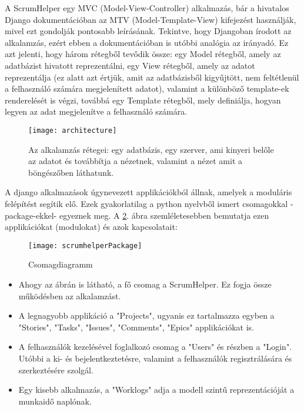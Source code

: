 A ScrumHelper egy MVC (Model-View-Controller) alkalmazás, bár a hivatalos Django dokumentációban az MTV (Model-Template-View) kifejezést használják, mivel ezt gondolják pontosabb leírásának. Tekintve, hogy Djangoban írodott az alkalamzás, ezért ebben a dokumentációban is utóbbi analógia az irányadó. Ez azt jelenti, hogy három rétegből tevődik össze: egy Model rétegből, amely az adatbázist hivatott reprezentálni, egy View rétegből, amely az adatot reprezentálja (ez alatt azt értjük, amit az adatbázisből kigyűjtött, nem feltétlenül a felhasználó számára megjelenített adatot), valamint a különböző template-ek renderelését is végzi, továbbá egy Template rétegből, mely definiálja, hogyan legyen az adat megjelenítve a felhasználó számára.

\begin{figure}[H]
	\centering
	\texttt{[image: architecture]}
	\caption{Az alkalamzás rétegei: egy adatbázis, egy szerver, ami kinyeri belőle az adatot és továbbítja a nézetnek, valamint a nézet amit a böngészőben láthatunk.}
	\label{fig:architecture}
\end{figure}

A django alkalmazások úgynevezett applikációkból állnak, amelyek a moduláris felépítést segítik elő. Ezek gyakorlatilag a python nyelvből ismert csomagokkal -package-ekkel- egyeznek meg. A \ref{fig:packages}. ábra szemléletesebben bemutatja ezen applikációkat (modulokat) és azok kapcsolatait:

\begin{figure}[H]
	\centering
	\texttt{[image: scrumhelperPackage]}
	\caption{Csomagdiagramm}
	\label{fig:packages}
\end{figure}

\pagebreak

\begin{itemize}
 	\item Ahogy az ábrán is látható, a fő csomag a ScrumHelper. Ez fogja össze működésben az alkalamzást.
	\item A legnagyobb applikáció a "Projects", ugyanis ez tartalmazza egyben a "Stories", "Tasks", "Issues", "Comments", "Epics" applikációkat is.
	\item A felhasználók kezelésével foglalkozó csomag a "Users" és részben a "Login". Utóbbi a ki- és bejelentkeztetésre, valamint a felhasználók regisztrálására és szerkeztésére szolgál.
	\item Egy kisebb alkalmazás, a "Worklogs" adja a modell szintű reprezentációját a munkaidő naplónak.
\end{itemize}

